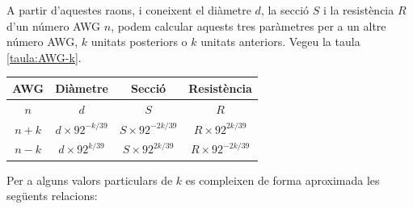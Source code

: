 A partir d'aquestes raons, i coneixent el diàmetre $d$, la secció $S$ i la resistència $R$ d'un número AWG $n$, podem calcular aquests tres paràmetres per a un altre número AWG, $k$ unitats posteriors o $k$ unitats anteriors. Vegeu la taula \vref{taula:AWG-k}.


\begin{center}
	\label{taula:AWG-k}
	\begin{tabular}{cccc}
		\toprule[1pt]
		AWG & Diàmetre & Secció & Resistència
		\\
		\midrule
		$n$ & $d$ & $S$ & $R$ \\
		$n+k$   & $d\times92^{-k/39}$ & $S\times92^{-2k/39}$ & $R\times92^{2k/39}$ \\
		$n-k$   & $d\times92^{k/39}$ & $S\times92^{2k/39}$ & $R\times92^{-2k/39}$ \\
		\bottomrule[1pt]
	\end{tabular}
\end{center}

Per a alguns valors particulars de $k$ es compleixen de forma aproximada les següents relacions:

